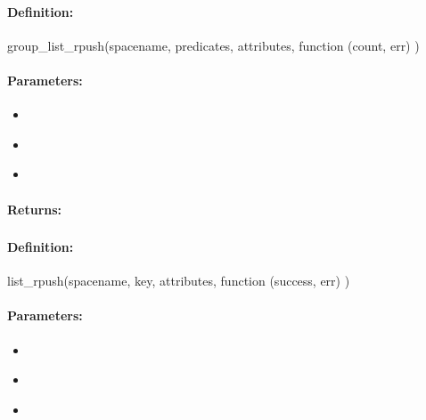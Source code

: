 \paragraph{Definition:}
\begin{javascriptcode}
group_list_rpush(spacename, predicates, attributes, function (count, err) {})
\end{javascriptcode}
\paragraph{Parameters:}
\begin{itemize}[noitemsep]
\item {}\\

\item {}\\

\item {}\\

\end{itemize}

\paragraph{Returns:}


\pagebreak
\subsubsection{}
\label{api:nodejs:list_rpush}


\paragraph{Definition:}
\begin{javascriptcode}
list_rpush(spacename, key, attributes, function (success, err) {})
\end{javascriptcode}
\paragraph{Parameters:}
\begin{itemize}[noitemsep]
\item {}\\

\item {}\\

\item {}\\

\end{itemize}

